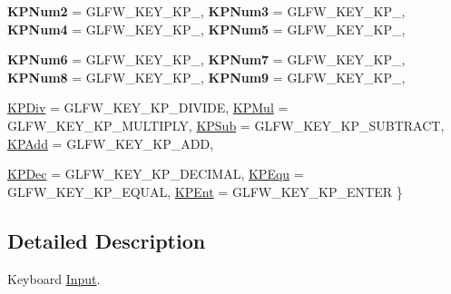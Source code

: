 \begin{DoxyCompactItemize}
{\bfseries KPNum2} =  GLFW\_\-KEY\_\-KP\_, 
{\bfseries KPNum3} =  GLFW\_\-KEY\_\-KP\_, 
{\bfseries KPNum4} =  GLFW\_\-KEY\_\-KP\_, 
{\bfseries KPNum5} =  GLFW\_\-KEY\_\-KP\_, 
\par
{\bfseries KPNum6} =  GLFW\_\-KEY\_\-KP\_, 
{\bfseries KPNum7} =  GLFW\_\-KEY\_\-KP\_, 
{\bfseries KPNum8} =  GLFW\_\-KEY\_\-KP\_, 
{\bfseries KPNum9} =  GLFW\_\-KEY\_\-KP\_, 
\par
\hyperlink{namespace_f2_c_1_1_keyboard_event_a13172bec547dc5eb2eee6c4fcd64c486ab9ed07a34f2168901ab616dbc613939a}{KPDiv} =  GLFW\_\-KEY\_\-KP\_\-DIVIDE, 
\hyperlink{namespace_f2_c_1_1_keyboard_event_a13172bec547dc5eb2eee6c4fcd64c486a2cecfa25a3c9541bc08c0ed8bd29b326}{KPMul} =  GLFW\_\-KEY\_\-KP\_\-MULTIPLY, 
\hyperlink{namespace_f2_c_1_1_keyboard_event_a13172bec547dc5eb2eee6c4fcd64c486ac4e241535378f81e5961de3bf245a409}{KPSub} =  GLFW\_\-KEY\_\-KP\_\-SUBTRACT, 
\hyperlink{namespace_f2_c_1_1_keyboard_event_a13172bec547dc5eb2eee6c4fcd64c486a88521d0a4e1a6df57ab87a20d9f4ff2f}{KPAdd} =  GLFW\_\-KEY\_\-KP\_\-ADD, 
\par
\hyperlink{namespace_f2_c_1_1_keyboard_event_a13172bec547dc5eb2eee6c4fcd64c486aad999f4132a5137f1a2cff69fd3b900a}{KPDec} =  GLFW\_\-KEY\_\-KP\_\-DECIMAL, 
\hyperlink{namespace_f2_c_1_1_keyboard_event_a13172bec547dc5eb2eee6c4fcd64c486a2df88c69c63cdbf1e7ab3f850bac5fe7}{KPEqu} =  GLFW\_\-KEY\_\-KP\_\-EQUAL, 
\hyperlink{namespace_f2_c_1_1_keyboard_event_a13172bec547dc5eb2eee6c4fcd64c486afc44f0625a0ce586bd15509b7562adb8}{KPEnt} =  GLFW\_\-KEY\_\-KP\_\-ENTER
 \}
\end{DoxyCompactItemize}


\subsection{Detailed Description}
Keyboard \hyperlink{class_f2_c_1_1_input}{Input}. 

